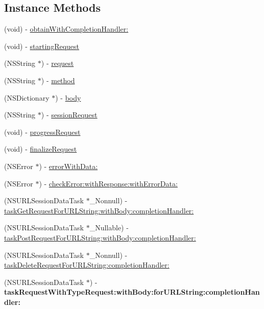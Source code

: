 \subsection*{Instance Methods}
\begin{DoxyCompactItemize}
\item 
(void) -\/ \hyperlink{interface_s_t_c_networking_manager_aa440c5c6bc3dd49061dfaf9c250a6c66}{obtain\+With\+Completion\+Handler\+:}
\item 
(void) -\/ \hyperlink{interface_s_t_c_networking_manager_a4b1b5cddaa078e5aa939c7a6cc08c3c9}{starting\+Request}
\item 
(N\+S\+String $\ast$) -\/ \hyperlink{interface_s_t_c_networking_manager_ac6682cc51af8bdad452f8af5bb1257d4}{request}
\item 
(N\+S\+String $\ast$) -\/ \hyperlink{interface_s_t_c_networking_manager_af79912da518a87b9999b0f72bfebb32c}{method}
\item 
(N\+S\+Dictionary $\ast$) -\/ \hyperlink{interface_s_t_c_networking_manager_ac5b20e2356d4fb18337fe7419f8acc3d}{body}
\item 
(N\+S\+String $\ast$) -\/ \hyperlink{interface_s_t_c_networking_manager_a5885762567f9197c67adda892b660b2d}{session\+Request}
\item 
(void) -\/ \hyperlink{interface_s_t_c_networking_manager_a0d41396419e85cc70d42ac278510d41f}{progress\+Request}
\item 
(void) -\/ \hyperlink{interface_s_t_c_networking_manager_a84f4d89ed72ec39054d9a4e4e797e7f2}{finalize\+Request}
\item 
(N\+S\+Error $\ast$) -\/ \hyperlink{interface_s_t_c_networking_manager_a53cd7cc498ad57ef65bbde70d7ed73b3}{error\+With\+Data\+:}
\item 
(N\+S\+Error $\ast$) -\/ \hyperlink{interface_s_t_c_networking_manager_aaabcac801d72fb8859284404965ec580}{check\+Error\+:with\+Response\+:with\+Error\+Data\+:}
\item 
(N\+S\+U\+R\+L\+Session\+Data\+Task $\ast$\+\_\+\+Nonnull) -\/ \hyperlink{interface_s_t_c_networking_manager_a46b2c22ca530b473fe9b6e4a5cdb5d7f}{task\+Get\+Request\+For\+U\+R\+L\+String\+:with\+Body\+:completion\+Handler\+:}
\item 
(N\+S\+U\+R\+L\+Session\+Data\+Task $\ast$\+\_\+\+Nullable) -\/ \hyperlink{interface_s_t_c_networking_manager_a37c2e90cf13e74182487be0f537a6321}{task\+Post\+Request\+For\+U\+R\+L\+String\+:with\+Body\+:completion\+Handler\+:}
\item 
(N\+S\+U\+R\+L\+Session\+Data\+Task $\ast$\+\_\+\+Nonnull) -\/ \hyperlink{interface_s_t_c_networking_manager_a7cf3e2d4e1f5b8a1414c392b43ee63bd}{task\+Delete\+Request\+For\+U\+R\+L\+String\+:completion\+Handler\+:}
\item 
\hypertarget{interface_s_t_c_networking_manager_a3611a93c8a7d36d4fbbbeb4c70132150}{}\label{interface_s_t_c_networking_manager_a3611a93c8a7d36d4fbbbeb4c70132150} 
(N\+S\+U\+R\+L\+Session\+Data\+Task $\ast$) -\/ {\bfseries task\+Request\+With\+Type\+Request\+:with\+Body\+:for\+U\+R\+L\+String\+:completion\+Handler\+:}
\end{DoxyCompactItemize}
